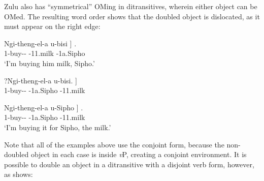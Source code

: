 \documentclass[output=paper]{langscibook}
\begin{document}





\noindent Zulu also has ``symmetrical'' OMing in ditransitives, wherein either object can be OMed. The resulting word order shows that the doubled object is dislocated, as it must appear on the right edge: 

\ea 
\begin{xlist}

\ex 
\gll Ngi-theng-el-a u-bisi {]} .\\
1\Om-buy-\Appl-\Fv{} \Aug-11.milk {} \Aug-1a.Sipho \\
\glt `I’m buying him milk, Sipho.’

\ex 
\gll *?Ngi-theng-el-a  u-bisi. {]}\\
1\Om-buy-\Appl-\Fv{} \Aug-1a.Sipho \Aug-11.milk \\

\ex 
\gll Ngi-theng-el-a u-Sipho {]} . \\
1\Om-buy-\Appl-\Fv{} \Aug-1a.Sipho {} \Aug-11.milk \\
\glt `I’m buying it for Sipho, the milk.’ \citep[22]{Zeller:2015:ZuluDrD}

\end{xlist}
\z

\noindent Note that all of the examples above use the conjoint form, because the non-doubled object in each case is inside \textit{v}P, creating a conjoint environment. It is possible to double an object in a ditransitive with a disjoint verb form, however, as \citet[23]{Zeller:2015:ZuluDrD} shows: 
\end{document}
